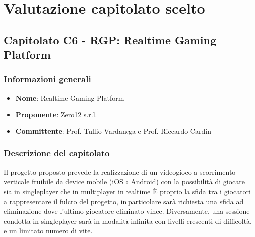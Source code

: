 \section{Valutazione capitolato scelto}
	\subsection{Capitolato C6 - RGP: Realtime Gaming Platform}
		\subsubsection{Informazioni generali}
			\begin{itemize}
				\item\textbf{Nome}: Realtime Gaming Platform
				\item\textbf{Proponente}: Zero12 s.r.l.
				\item\textbf{Committente}: Prof. Tullio Vardanega e Prof. Riccardo Cardin
			\end{itemize}
			
		\subsubsection{Descrizione del capitolato}
			Il progetto proposto prevede la realizzazione di un videogioco a scorrimento verticale fruibile da device mobile (iOS o Android) con la possibilità di giocare sia in singleplayer che in multiplayer in realtime
			È proprio la sfida tra i giocatori a rappresentare il fulcro del progetto, in particolare sarà richiesta una sfida ad eliminazione dove l’ultimo giocatore eliminato vince. 
			Diversamente, una sessione condotta in singleplayer sarà in modalità infinita con livelli crescenti di difficoltà, e un limitato numero di vite.
		
